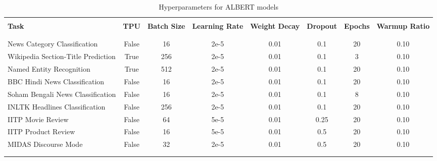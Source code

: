 \documentclass[11pt]{article}
\begin{document}
\begin{table*}[hbt!]
\begin{center}
\begin{adjustbox}{max width=\textwidth}
\small
\begin{tabular}{l c c c c c c c}
\\ \hline \\
\textbf{Task} & \textbf{TPU} & \textbf{Batch Size} & \textbf{Learning Rate} & \textbf{Weight Decay} & \textbf{Dropout} & \textbf{Epochs} & \textbf{Warmup Ratio} \\
\\ \hline \\
News Category Classification  & False & 16 & 2e-5 & 0.01 & 0.1 & 20 & 0.10 \\
Wikipedia Section-Title Prediction & True & 256 & 2e-5 & 0.01 & 0.1 & 3 & 0.10 \\
Named Entity Recognition & True & 512 & 2e-5 & 0.01 & 0.1 & 20 & 0.10 \\
BBC Hindi News Classification & False & 16 & 2e-5 & 0.01 & 0.1 & 20 & 0.10 \\
Soham Bengali News Classification & False & 16 & 2e-5 & 0.01 & 0.1 & 8 & 0.10 \\
INLTK Headlines Classification & False & 256 & 2e-5 & 0.01 & 0.1 & 20 & 0.10 \\
IITP Movie Review & False & 64 & 5e-5 & 0.01 & 0.25 & 20 & 0.10 \\
IITP Product Review & False & 16 & 5e-5 & 0.01 & 0.5 & 20 & 0.10 \\
MIDAS Discourse Mode & False & 32 & 2e-5 & 0.01 & 0.5 & 20 & 0.10 \\
\\ \hline \\
\end{tabular}
\end{adjustbox}
\end{center}
\caption{Hyperparameters for ALBERT models}
\label{downstream-hyperparameters-tb-albert}
\end{table*}
\end{document}
